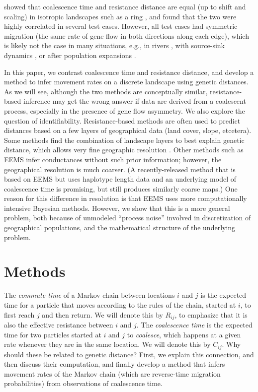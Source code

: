 \documentclass{article}
\begin{document}
\citet{mcrae2006isolation} showed that coalescence time and resistance distance are equal
(up to shift and scaling) in isotropic landscapes such as a ring \citep{matsen2006convergence},
and found that the two were highly correlated in several test cases.
However, all test cases had symmetric migration
(the same rate of gene flow in both directions along each edge),
which is likely not the case in many situations, e.g.,
in rivers \citep{morrissey2009maintenance,sundqvist2016directional,hanks2017modeling},
with source-sink dynamics \citep{dias1996sources},
or after population expansions \citep{with2002landscape}.

In this paper, we contrast 
coalescence time and resistance distance,
and develop a method to infer movement rates on a discrete landscape
using genetic distances.
As we will see,
although the two methods are conceptually similar,
resistance-based inference may get the wrong answer if data are derived from a coalescent process,
especially in the presence of gene flow asymmetry. 
We also explore the question of identifiability.
Resistance-based methods are often used to predict distances based on a few layers of geographical data
(land cover, slope, etcetera).
Some methods find the combination of landscape layers to best explain genetic distance,
which allows very fine geographic resolution \citep{shaffer2017desert}.
Other methods such as EEMS \citep{petkova2016visualizing} infer conductances without such prior information; 
however, the geographical resolution is much coarser.
(A recently-released method 
that is based on EEMS but uses haplotype length data and an underlying model of coalescence time
\citep{alasadi2018estimating}
is promising, but still produces similarly coarse maps.)
One reason for this difference in resolution
is that EEMS uses more computationally intensive Bayesian methods.
However, we show that this is a more general problem, 
both because of unmodeled ``process noise'' involved in discretization of geographical populations,
and the mathematical structure of the underlying problem.


\section*{Methods}


The \emph{commute time} of a Markov chain between locations $i$ and $j$
is the expected time for a particle that moves according to the rules of the chain, 
started at $i$, to first reach $j$ and then return.
We will denote this by $R_{ij}$, to emphasize that it is also the effective resistance
between $i$ and $j$.
The \emph{coalescence time} is the expected time for two particles started at $i$ and $j$
to \emph{coalesce},
which happens at a given rate whenever they are in the same location.
We will denote this by $C_{ij}$.
Why should these be related to genetic distance? 
First, we explain this connection,
and then discuss their computation,
and finally develop a method that infers movement rates of the Markov chain
(which are reverse-time migration probabilities)
from observations of coalescence time. 
\end{document}
